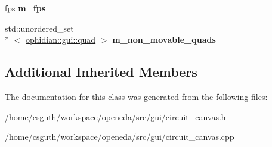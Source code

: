 \begin{DoxyCompactItemize}
\item 
\hypertarget{classophidian_1_1gui_1_1circuit__canvas_a2729fd12e209ef79a0bcc2ccf406aad4}{\hyperlink{classophidian_1_1gui_1_1fps}{fps} {\bfseries m\-\_\-fps}}\label{classophidian_1_1gui_1_1circuit__canvas_a2729fd12e209ef79a0bcc2ccf406aad4}

\item 
\hypertarget{classophidian_1_1gui_1_1circuit__canvas_ac7409d8ceeda8743c176bb77d06bf7af}{std\-::unordered\-\_\-set\\*
$<$ \hyperlink{structophidian_1_1gui_1_1quad}{ophidian\-::gui\-::quad} $>$ {\bfseries m\-\_\-non\-\_\-movable\-\_\-quads}}\label{classophidian_1_1gui_1_1circuit__canvas_ac7409d8ceeda8743c176bb77d06bf7af}

\end{DoxyCompactItemize}
\subsection*{Additional Inherited Members}


The documentation for this class was generated from the following files\-:\begin{DoxyCompactItemize}
\item 
/home/csguth/workspace/openeda/src/gui/circuit\-\_\-canvas.\-h\item 
/home/csguth/workspace/openeda/src/gui/circuit\-\_\-canvas.\-cpp\end{DoxyCompactItemize}
